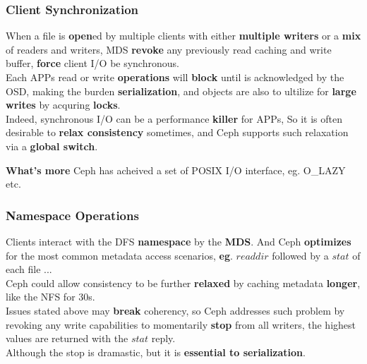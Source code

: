 \documentclass[cjk,slidestop,mathserif]{beamer}
\begin{document}
\begin{CJK}{UTF8}{gkai}
\begin{frame}
 \frametitle{Client Synchronization}
 \vspace{4pt}
 When a file is \textbf{open}ed by multiple clients with either \textbf{multiple writers} or a \textbf{mix} of readers and writers,
 MDS \textbf{revoke} any previously read caching and write buffer, \textbf{force} client I/O be synchronous. \\
 \vspace{4pt}
 Each APPs read or write \textbf{operations} will \textbf{block} until is acknowledged by the OSD, making the burden \textbf{serialization}, 
 and objects are also to ultilize for \textbf{large writes} by acquring \textbf{locks}. \\
 \vspace{4pt}
 Indeed, synchronous I/O can be a performance \textbf{killer} for APPs, So it is often desirable to \textbf{relax consistency} sometimes,
 and Ceph supports such relaxation via a \textbf{global switch}.
 
 \vspace{4pt}
 \textbf{What's more} Ceph has acheived a set of POSIX I/O interface, eg. O\_LAZY etc.
\end{frame}

\begin{frame}
 \frametitle{Namespace Operations}
 \vspace{6pt}
 Clients interact with the DFS \textbf{namespace} by the \textbf{MDS}. And Ceph \textbf{optimizes} for the most common metadata access scenarios,
 \textbf{eg}. $readdir$ followed by a $stat$ of each file ... \\
 \vspace{4pt}
 Ceph could allow consistency to be further \textbf{relaxed} by caching metadata \textbf{longer}, like the NFS for $30$s. \\
 \vspace{4pt}
 Issues stated above may \textbf{break} coherency, so Ceph addresses such problem by revoking any write capabilities 
 to momentarily \textbf{stop} from all writers, the highest values are returned with the $stat$ reply.\\
 \vspace{4pt}
 Although the stop is dramastic, but it is \textbf{essential to serialization}.
\end{frame}


\end{CJK}
\end{document}
